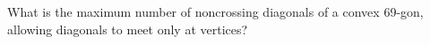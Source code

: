 What is the maximum number of noncrossing diagonals of a convex 69-gon, allowing diagonals to meet only at vertices?
